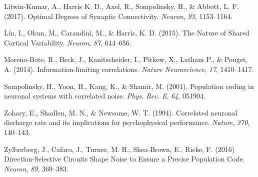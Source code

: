 \documentclass[12pt]{article}
\begin{document}
\begin{thebibliography}{100}
Litwin-Kumar, A., Harris K. D., Axel, R., Sompolinsky, H., \& Abbott, L. F. (2017).
\newblock Optimal Degrees of Synaptic Connectivity.
\newblock \emph{Neuron}, \emph{93}, 1153--1164.

Lin, I., Okun, M., Carandini, M., \& Harris, K. D. (2015).
\newblock The Nature of Shared Cortical Variability.
\newblock \emph{Neuron}, \emph{87}, 644--656.

Moreno-Bote, R., Beck, J., Kanitscheider, I., Pitkow, X., Latham P., \& Pouget, A. (2014).
\newblock Information-limiting correlations.
\newblock \emph{Nature Neuroscience}, \emph{17}, 1410--1417.

Sompolinsky, H., Yoon, H., Kang, K., \& Shamir, M. (2001).
Population coding in neuronal systems with correlated noise.
\newblock \emph{Phys. Rev. E}, \emph{64}, 051904.

Zohary, E., Shadlen, M. N., \& Newsome, W. T. (1994).
\newblock Correlated neuronal discharge rate and its implications for psychophysical performance.
\newblock \emph{Nature}, \emph{370}, 140--143.

Zylberberg, J., Cafaro, J., Turner, M. H., Shea-Brown, E., Rieke, F. (2016)
\newblock Direction-Selective Circuits Shape Noise to Ensure a Precise Population Code.
\newblock \emph{Neuron}, \emph{89}, 369--383.


\end{thebibliography}
\end{document}
